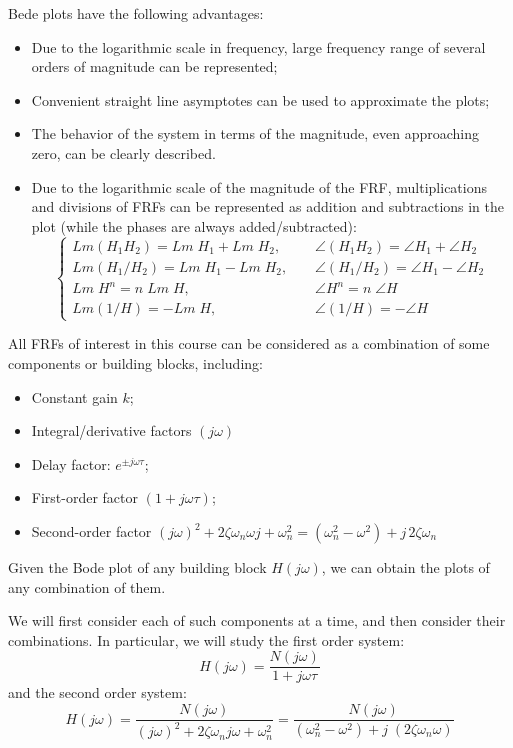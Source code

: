 \documentclass{article}
\begin{document}
Bede plots have the following advantages:
\begin{itemize}
  \item Due to the logarithmic scale in frequency, large frequency range of 
    several orders of magnitude can be represented;

  \item Convenient straight line asymptotes can be used to approximate the plots;

  \item The behavior of the system in terms of the magnitude, even
    approaching zero, can be clearly described.
    
  \item Due to the logarithmic scale of the magnitude of the FRF, multiplications 
    and divisions of FRFs can be represented as addition and subtractions in the 
    plot (while the phases are always added/subtracted):
    \begin{equation} \left\{ \begin{array}{ll}
      Lm(H_1H_2)=Lm\;H_1+Lm\;H_2,&\;\;\;\;\angle (H_1H_2)=\angle H_1+\angle H_2\\
      Lm(H_1/H_2)=Lm\;H_1-Lm\;H_2,&\;\;\;\;\angle (H_1/H_2)=\angle H_1-\angle H_2\\
      Lm \;H^n=n\;Lm \;H,&\;\;\;\;\angle H^n=n\;\angle H \\
      Lm (1/H)=-Lm\;H,&\;\;\;\;\angle (1/H)=-\angle H \end{array} \right. \end{equation}
\end{itemize}

All FRFs of interest in this course can be considered as a combination of 
some components or building blocks, including:
\begin{itemize}
  \item Constant gain $k$;
  \item Integral/derivative factors $(j\omega)$
  \item Delay factor: $e^{\pm j\omega \tau}$;
  \item First-order factor $(1+j\omega\tau)$;
  \item Second-order factor 
    $(j\omega)^2+2\zeta\omega_n\omega j+\omega_n^2
    =(\omega_n^2-\omega^2)+j\,2\zeta\omega_n$
\end{itemize}
Given the Bode plot of any building block $H(j\omega)$, we can obtain the plots
of any combination of them.

We will first consider each of such components at a time, and then consider 
their combinations. In particular, we will study the first order system:
\begin{equation} H(j\omega)=\frac{N(j\omega)}{1+j\omega \tau} \end{equation}
and the second order system:
\begin{equation} H(j\omega)=\frac{N(j\omega)}{(j\omega)^2+2\zeta\omega_n j\omega +\omega_n^2}
=\frac{N(j\omega)}{(\omega_n^2-\omega^2)+j\;(2\zeta\omega_n \omega) }\end{equation}
\end{document}
